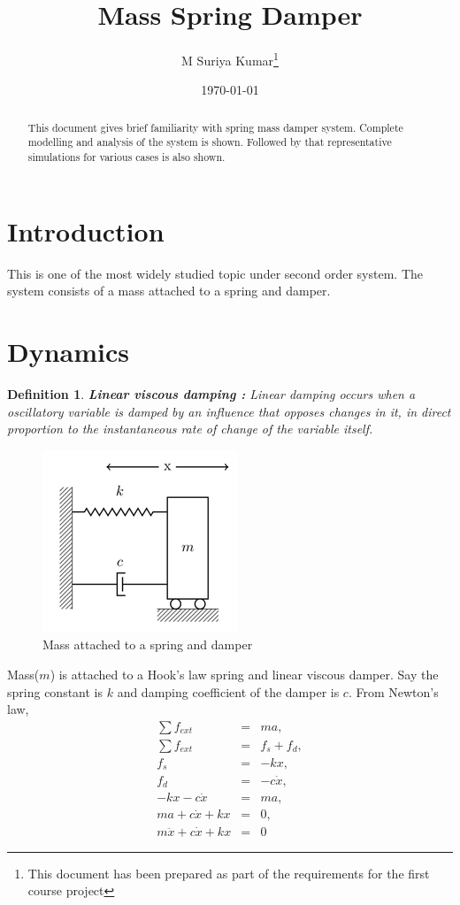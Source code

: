 \documentclass[11pt]{article}
\title{Mass Spring Damper}
\author{M Suriya Kumar\thanks{This document has been prepared as part of the requirements for the first course project}}
\date{\today}
\newtheorem*{defn}{Definition}
\begin{document}
\maketitle
\begin{abstract}
This document gives brief familiarity with spring mass damper system. Complete modelling and analysis of 
the system is shown. Followed by that representative simulations for various cases is also shown.
\end{abstract}
\section{Introduction}
This is one of the most widely studied topic under second order system. The system consists of a mass attached to a spring and damper.  

\section{Dynamics}
\begin{defn}
\hfill \break
\textbf{Linear viscous damping \cite{wiki} :} Linear damping occurs when a oscillatory variable is damped 
by an influence that opposes changes in it, in direct proportion to the instantaneous rate of change 
of the variable itself.
\end{defn}

\begin{figure}[H]
	\begin{center}
	\includegraphics[scale=0.8]{spring_mass_damper.png}
	\caption{Mass attached to a spring and damper}
	\centering
	\end{center}
\end{figure}

Mass($m$) is attached to a Hook's law spring and linear viscous damper. Say the spring constant 
is $k$ and damping coefficient of the damper is $c$.
\hfil \break
From Newton's law, 
\begin{eqnarray*}
\sum f_{ext} &=& ma, \\
\sum f_{ext} &=& f_s + f_d, \\
f_s &=& -kx, 	\\
f_d &=& -c\dot{x}, \\
-kx - c\dot{x} &=& ma, \\
ma + c\dot{x} + kx &=& 0, \\
m\ddot{x} + c\dot{x} + kx &=& 0
\end{eqnarray*}
\end{document}
